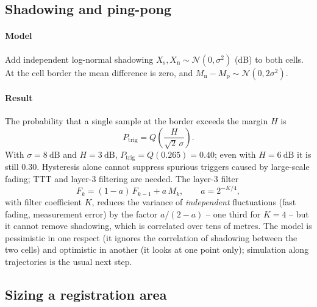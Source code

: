 \documentclass[11pt,a4paper]{article}
\begin{document}
\begin{acnfigure}
  \caption{A3 triggering: the neighbour must exceed the serving cell by $\Off + \Hys = 3$\,dB
  (dotted) for $\TTT = 320$\,ms before the measurement report is sent.}
  \label{fig:a3}
\end{acnfigure}

\subsection{Shadowing and ping-pong}\label{sec:pingpong}
\paragraph{Model} Add independent log-normal shadowing $X_\mathrm{s}, X_\mathrm{n}\sim\mathcal{N}(0,\sigma^2)$
(dB) to both cells. At the cell border the mean difference is zero, and
$M_\mathrm{n} - M_\mathrm{p} \sim \mathcal{N}(0, 2\sigma^2)$.
\paragraph{Result} The probability that a single sample at the border exceeds the margin $H$ is
\begin{equation}\label{eq:pingpong}
  P_{\mathrm{trig}} = Q\!\left(\frac{H}{\sqrt{2}\,\sigma}\right).
\end{equation}
With $\sigma = \qty{8}{\dB}$ and $H = \qty{3}{\dB}$, $P_{\mathrm{trig}} = Q(0.265) = 0.40$; even with
$H=\qty{6}{\dB}$ it is still $0.30$. Hysteresis alone cannot suppress spurious triggers caused by
large-scale fading; TTT and layer-3 filtering are needed. The layer-3 filter
\begin{equation}\label{eq:l3filter}
  F_k = (1-a)\,F_{k-1} + a\,M_k, \qquad a = 2^{-K/4},
\end{equation}
with filter coefficient $K$, reduces the variance of \emph{independent} fluctuations (fast
fading, measurement error) by the factor $a/(2-a)$ -- one third for $K=4$ -- but it cannot remove
shadowing, which is correlated over tens of metres. The model is pessimistic in one respect
(it ignores the correlation of shadowing between the two cells) and optimistic in another (it
looks at one point only); simulation along trajectories is the usual next step.

\subsection{Sizing a registration area}\label{sec:lasize}
\end{document}
